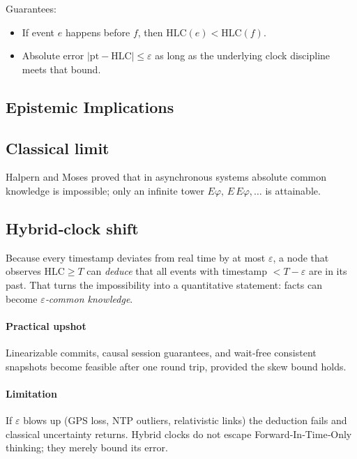 \documentclass[../../../OAE-SPEC-MAIN.tex]{subfiles}
\begin{document}
Guarantees:

\begin{itemize}
\item If event $e$ happens before $f$, then $\text{HLC}(e)<\text{HLC}(f)$.
\item Absolute error $|\text{pt}-\text{HLC}| \le \varepsilon$ as long as
      the underlying clock discipline meets that bound.
\end{itemize}

\subsection{Epistemic Implications}

\subsection*{Classical limit}
Halpern and Moses proved that in asynchronous systems absolute common
knowledge is impossible; only an infinite tower
$E\varphi,\,E\,E\varphi,\ldots$ is attainable.

\subsection*{Hybrid‐clock shift}
Because every timestamp deviates from real time by at most
$\varepsilon$, a node that observes $\text{HLC}\ge T$ can
\emph{deduce} that all events with timestamp $<T-\varepsilon$ are in its
past.  That turns the impossibility into a quantitative statement:
facts can become \emph{$\varepsilon$‐common knowledge}.


\paragraph{Practical upshot}
Linearizable commits, causal session guarantees, and wait‐free
consistent snapshots become feasible after one round trip, provided the
skew bound holds.

\paragraph{Limitation}
If $\varepsilon$ blows up (GPS loss, NTP outliers, relativistic links)
the deduction fails and classical uncertainty returns. Hybrid clocks do
not escape Forward‑In‑Time‑Only thinking; they merely bound its error.
\end{document}
